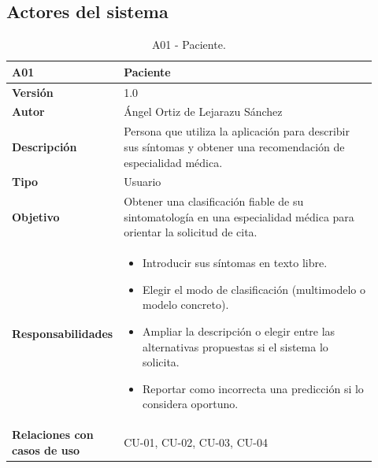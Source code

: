\subsection*{Actores del sistema}
\begin{table}[H]
	\centering
	\begin{tabular}{ p{0.21\linewidth} p{0.71\linewidth} }
		\toprule
		\textbf{A01}    & \textbf{Paciente}\\
		\toprule
		\textbf{Versión}         & 1.0 \\
		\textbf{Autor}           & Ángel Ortiz de Lejarazu Sánchez \\
		\textbf{Descripción}     & Persona que utiliza la aplicación para describir sus síntomas y obtener una recomendación de especialidad médica. \\
		\textbf{Tipo}            & Usuario \\
		\textbf{Objetivo}        & Obtener una clasificación fiable de su sintomatología en una especialidad médica para orientar la solicitud de cita. \\
		\textbf{Responsabilidades} &
		\begin{itemize}
			\item Introducir sus síntomas en texto libre.
			\item Elegir el modo de clasificación (multimodelo o modelo concreto).
			\item Ampliar la descripción o elegir entre las alternativas propuestas si el sistema lo solicita.
			\item Reportar como incorrecta una predicción si lo considera oportuno.
		\end{itemize} \\
		\textbf{Relaciones con casos de uso} & CU-01, CU-02, CU-03, CU-04 \\
		\bottomrule
	\end{tabular}
	\caption{A01 - Paciente.}
\end{table}

